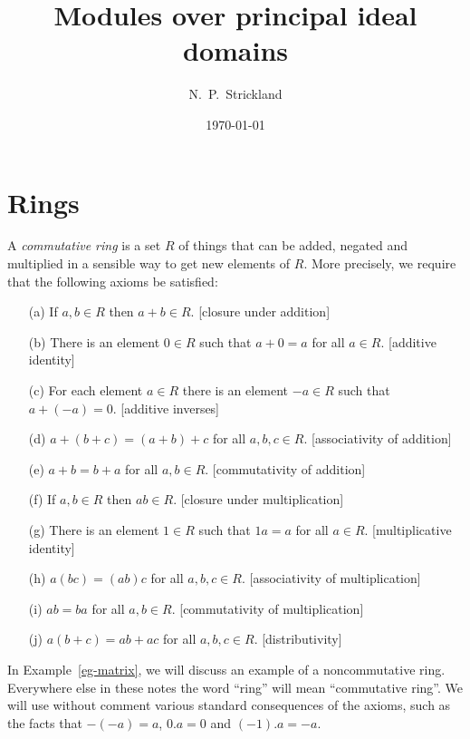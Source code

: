 \documentclass{amsart}
\renewcommand{\:}{\colon}
\theoremstyle{definition}
\begin{document}
\title{Modules over principal ideal domains}
\author{N.~P.~Strickland}
\date{\today}


\maketitle 

\section{Rings}

A \emph{commutative ring} is a set $R$ of things that can be added,
negated and multiplied in a sensible way to get new elements of $R$.
More precisely, we require that the following axioms be satisfied:
\begin{itemize}
 \item[(a)] If $a,b\in R$ then $a+b\in R$.
  [closure under addition]
 \item[(b)] There is an element $0\in R$ such that $a+0=a$ for all
  $a\in R$.
  [additive identity]
 \item[(c)] For each element $a\in R$ there is an element $-a\in R$
  such that $a+(-a)=0$. 
  [additive inverses]
 \item[(d)] $a+(b+c)=(a+b)+c$ for all $a,b,c\in R$.
  [associativity of addition]
 \item[(e)] $a+b=b+a$ for all $a,b\in R$.
  [commutativity of addition]
 \item[(f)] If $a,b\in R$ then $ab\in R$.
  [closure under multiplication]
 \item[(g)] There is an element $1\in R$ such that $1a=a$ for all
  $a\in R$.
  [multiplicative identity]
 \item[(h)] $a(bc)=(ab)c$ for all $a,b,c\in R$.
  [associativity of multiplication]
 \item[(i)] $ab=ba$ for all $a,b\in R$.
  [commutativity of multiplication]
 \item[(j)] $a(b+c)=ab+ac$ for all $a,b,c\in R$.
  [distributivity]
\end{itemize}
In Example~\ref{eg-matrix}, we will discuss an example of a
noncommutative ring.  Everywhere else in these notes the word ``ring''
will mean ``commutative ring''.  We will use without comment various
standard consequences of the axioms, such as the facts that $-(-a)=a$,
$0.a=0$ and $(-1).a=-a$.
\end{document}
